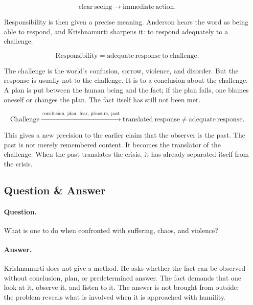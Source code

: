 \documentclass[11pt,oneside]{book}
\begin{document}
\begin{equation}
\mathrm{clear\ seeing}
\longrightarrow
\mathrm{immediate\ action}.
\end{equation}

Responsibility is then given a precise meaning. Anderson hears the word as being able to respond, and Krishnamurti sharpens it: to respond adequately to a challenge.

\begin{equation}
\mathrm{Responsibility}
=
\mathrm{adequate\ response\ to\ challenge}.
\end{equation}

The challenge is the world's confusion, sorrow, violence, and disorder. But the response is usually not to the challenge. It is to a conclusion about the challenge. A plan is put between the human being and the fact; if the plan fails, one blames oneself or changes the plan. The fact itself has still not been met.

\begin{equation}
\mathrm{Challenge}
\xrightarrow{\ \mathrm{conclusion,\ plan,\ fear,\ pleasure,\ past}\ }
\mathrm{translated\ response}
\neq
\mathrm{adequate\ response}.
\end{equation}

This gives a new precision to the earlier claim that the observer is the past. The past is not merely remembered content. It becomes the translator of the challenge. When the past translates the crisis, it has already separated itself from the crisis.

\subsection{Question \& Answer}

\paragraph{Question.}
What is one to do when confronted with suffering, chaos, and violence?

\paragraph{Answer.}
Krishnamurti does not give a method. He asks whether the fact can be observed without conclusion, plan, or predetermined answer. The fact demands that one look at it, observe it, and listen to it. The answer is not brought from outside; the problem reveals what is involved when it is approached with humility.
\end{document}
